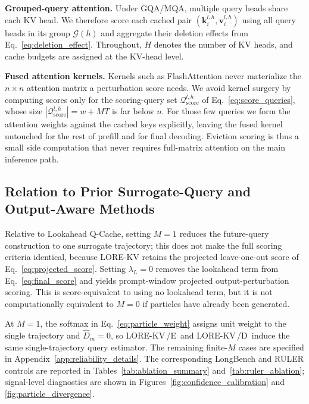 \documentclass{article} %
\newcommand{\lorekvE}{LORE-KV\,/E}
\newcommand{\lorekvD}{LORE-KV\,/D}
\begin{document}
\textbf{Grouped-query attention.}
Under GQA/MQA, multiple query heads share each KV head. We therefore score each cached pair $(\mathbf{k}^{l,h}_{i},\mathbf{v}^{l,h}_{i})$ using all query heads in its group $\mathcal{G}(h)$ and aggregate their deletion effects from Eq.~\ref{eq:deletion_effect}. Throughout, $H$ denotes the number of KV heads, and cache budgets are assigned at the KV-head level.

\textbf{Fused attention kernels.}
Kernels such as FlashAttention never materialize the $n\times n$ attention matrix a perturbation score needs. We avoid kernel surgery by computing scores only for the scoring-query set $\mathcal{Q}^{l,h}_{\mathrm{score}}$ of Eq.~\ref{eq:score_queries}, whose size $|\mathcal{Q}^{l,h}_{\mathrm{score}}|=w+MT$ is far below $n$. For those few queries we form the attention weights against the cached keys explicitly, leaving the fused kernel untouched for the rest of prefill and for final decoding. Eviction scoring is thus a small side computation that never requires full-matrix attention on the main inference path.

\subsection{Relation to Prior Surrogate-Query and Output-Aware Methods}
\label{app:lookahead_details}

Relative to Lookahead Q-Cache, setting $M{=}1$ reduces the
future-query construction to one surrogate trajectory; this does not
make the full scoring criteria identical, because LORE-KV retains the
projected leave-one-out score of Eq.~\ref{eq:projected_score}.
Setting $\lambda_L{=}0$ removes the lookahead term from
Eq.~\ref{eq:final_score} and yields prompt-window projected
output-perturbation scoring. This is score-equivalent to using no
lookahead term, but it is not computationally equivalent to $M{=}0$
if particles have already been generated.

At $M{=}1$, the softmax in Eq.~\ref{eq:particle_weight} assigns
unit weight to the single trajectory and $\hat D_m=0$, so
\lorekvE\ and \lorekvD\ induce the same single-trajectory query
estimator. The remaining finite-$M$ cases are specified in
Appendix~\ref{app:reliability_details}. The corresponding LongBench
and RULER controls are reported in
Tables~\ref{tab:ablation_summary} and~\ref{tab:ruler_ablation};
signal-level diagnostics are shown in
Figures~\ref{fig:confidence_calibration} and
\ref{fig:particle_divergence}.
\end{document}
